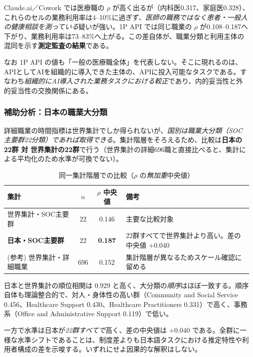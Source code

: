 \documentclass[11pt]{article}
\theoremstyle{plain}
\theoremstyle{definition}
\theoremstyle{remark}
\begin{document}
Claude.ai／Cowork では医療職の $\rho$ が高く出るが（内科医0.317、家庭医0.328）、これらのセルの業務利用率は4--10\%に過ぎず、\emph{医師の職務ではなく患者・一般人の健康相談を測っている}疑いが強い。1P API では同じ職業の $\rho$ が0.108--0.187へ下がり、業務利用率は73--83\%へ上がる。この差自体が、職業分類と利用主体の混同を示す\textbf{測定監査の結果}である。

なお 1P API の値も「一般の医療職全体」を代表しない。そこに現れるのは、APIとしてAIを組織的に導入できた主体の、APIに投入可能なタスクである。すなわち\emph{組織的にAI導入された業務タスクにおける較正}であり、内的妥当性と外的妥当性の交換関係にある。

\subsubsection{補助分析：日本の職業大分類}
詳細職業の時間指標は世界集計でしか得られないが、\emph{国別は職業大分類（SOC主要群22分類）であれば取得できる}。集計階層をそろえるため、比較は\textbf{日本の22群 対 世界集計の22群}で行う（世界集計の詳細696職と直接比べると、集計による平均化のため水準が可換でない）。

\begin{table}[h]\centering\small
\caption{同一集計階層での比較（$\rho$ の\emph{無加重}中央値）}\label{tab:aei-jp}
\begin{tabularx}{\textwidth}{@{}lccX@{}}
\toprule
集計 & $n$ & $\rho$ 中央値 & 備考 \\ \midrule
世界集計・SOC主要群 & 22 & 0.146 & 主要な比較対象 \\
\textbf{日本・SOC主要群} & 22 & \textbf{0.187} & 22群すべてで世界集計より高い。差の中央値 $+0.040$ \\
(参考) 世界集計・詳細職業 & 696 & 0.152 & 集計階層が異なるためスケール確認に留める \\
\bottomrule
\end{tabularx}
\end{table}

日本と世界集計の順位相関は $0.929$ と高く、大分類の\emph{順序}はほぼ一致する。順序自体も理論整合的で、対人・身体性の高い群（Community and Social Service 0.456、Healthcare Support 0.430、Healthcare Practitioners 0.331）で高く、事務系（Office and Administrative Support 0.119）で低い。

一方で水準は日本が\emph{22群すべてで}高く、差の中央値は $+0.040$ である。全群に一様な水準シフトであることは、制度差よりも日本語タスクにおける推定特性や利用者構成の差を示唆する。いずれにせよ因果的な解釈はしない。
\end{document}
